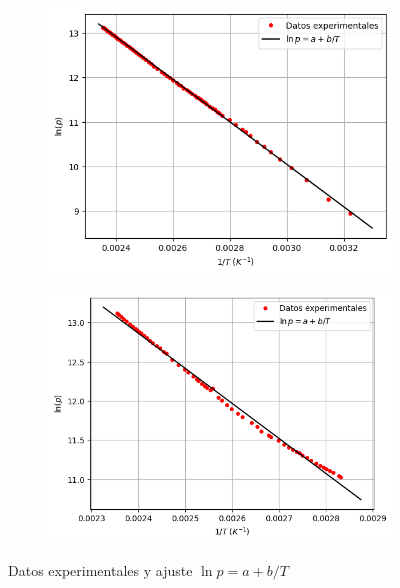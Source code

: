 \documentclass[a4paper,12pt,titlepage]{article}
\begin{document}
\begin{figure}[h!]
    \centering
    \begin{subfigure}{0.49\textwidth}
        \centering
        \includegraphics[width=1\linewidth]{ELV simple/cal_agua.png}
    \end{subfigure}
    \begin{subfigure}{0.49\textwidth}
        \centering
        \includegraphics[width=1.05\linewidth]{ELV simple/enf_agua.png}
    \end{subfigure}
    \caption{Datos experimentales y ajuste $\ln p = a + b/T$}
    \label{fig:enter-label}
\end{figure}
\end{document}
